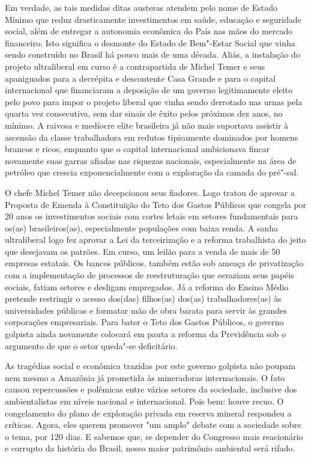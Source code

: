 Em verdade, as tais medidas ditas austeras atendem pelo nome de Estado
Mínimo que reduz drasticamente investimentos em saúde, educação e
seguridade social, além de entregar a autonomia econômica do País nas
mãos do mercado financeiro. Isto significa o desmonte do Estado de
Bem"-Estar Social que vinha sendo construído no Brasil há pouco mais de
uma década. Aliás, a instalação do projeto ultraliberal em curso é a
contrapartida de Michel Temer e seus apaniguados para a decrépita e
descontente Casa Grande e para o capital internacional que financiaram a
deposição de um governo legitimamente eleito pelo povo para impor o
projeto liberal que vinha sendo derrotado nas urnas pela quarta vez
consecutiva, sem dar sinais de êxito pelos próximos dez anos, no mínimo.
A raivosa e medíocre elite brasileira já não mais suportava assistir à
ascensão da classe trabalhadora em redutos tipicamente dominados por
homens brancos e ricos, enquanto que o capital internacional ambicionava
fincar novamente suas garras afiadas nas riquezas nacionais,
especialmente na área de petróleo que crescia exponencialmente com a
exploração da camada do pré"-sal.

O chefe Michel Temer não decepcionou seus fiadores. Logo tratou de
aprovar a Proposta de Emenda à Constituição do Teto dos Gastos Públicos
que congela por 20 anos os investimentos sociais com cortes letais em
setores fundamentais para os(as) brasileiros(as), especialmente
populações com baixa renda. A sanha ultraliberal logo fez aprovar a Lei
da terceirização e a reforma trabalhista do jeito que desejavam os
patrões. Em curso, um leilão para a venda de mais de 50 empresas
estatais. Os bancos públicos. também estão sob ameaça de privatização
com a implementação de processos de reestruturação que esvaziam seus
papéis sociais, fatiam setores e desligam empregados. Já a reforma do
Ensino Médio pretende restringir o acesso dos(das) filhos(as) dos(as)
trabalhadores(as) às universidades públicas e formatar mão de obra
barata para servir às grandes corporações empresariais. Para bater o
Teto dos Gastos Públicos, o governo golpista ainda novamente colocará em
pauta a reforma da Previdência sob o argumento de que o setor queda"-se
deficitário.

As tragédias social e econômica trazidas por este governo golpista não
poupam nem mesmo a Amazônia já prometida às mineradoras internacionais.
O fato causou repercussões e polêmicas entre vários setores da
sociedade, inclusive dos ambientalistas em níveis nacional e
internacional. Pois bem: houve recuo. O congelamento do plano de
exploração privada em reserva mineral respondeu a críticas. Agora, eles
querem promover "um amplo" debate com a sociedade sobre o tema, por 120
dias. E sabemos que, se depender do Congresso mais reacionário e
corrupto da história do Brasil, nosso maior patrimônio ambiental será
rifado.

